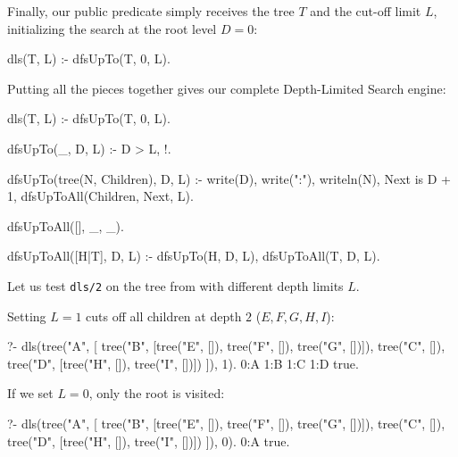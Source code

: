 Finally, our public predicate simply receives the tree $T$ and the cut-off limit $L$, initializing the search at the root level $D = 0$:

\begin{codeblock}
dls(T, L) :- 
    dfsUpTo(T, 0, L).
\end{codeblock}

Putting all the pieces together gives our complete Depth-Limited Search engine:

\begin{codeblock}
dls(T, L) :- 
    dfsUpTo(T, 0, L).

dfsUpTo(_, D, L) :- 
    D > L, 
    !.

dfsUpTo(tree(N, Children), D, L) :- 
    write(D), write(":"), writeln(N), 
    Next is D + 1, 
    dfsUpToAll(Children, Next, L).

dfsUpToAll([], _, _).

dfsUpToAll([H|T], D, L) :- 
    dfsUpTo(H, D, L),
    dfsUpToAll(T, D, L).
\end{codeblock}

Let us test \texttt{dls/2} on the tree from  with different depth limits $L$.

Setting $L = 1$ cuts off all children at depth $2$ ($E, F, G, H, I$):

\begin{codeblock}
?- dls(tree("A", [
           tree("B", [tree("E", []), tree("F", []), tree("G", [])]),
           tree("C", []),
           tree("D", [tree("H", []), tree("I", [])])
       ]), 1).
0:A
1:B
1:C
1:D
true.
\end{codeblock}

If we set $L = 0$, only the root is visited:

\begin{codeblock}
?- dls(tree("A", [
           tree("B", [tree("E", []), tree("F", []), tree("G", [])]),
           tree("C", []),
           tree("D", [tree("H", []), tree("I", [])])
       ]), 0).
0:A
true.
\end{codeblock}





